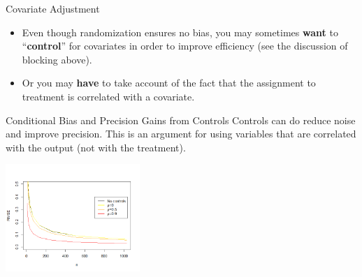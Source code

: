 \documentclass[
  11pt,
  ignorenonframetext,
]{beamer}
\providecommand{\tightlist}{%
  \setlength{\itemsep}{0pt}\setlength{\parskip}{0pt}}\usepackage{longtable,booktabs,array}
\begin{document}
\begin{frame}{Covariate Adjustment\label{CA}}
\protect\hypertarget{covariate-adjustment-4}{}
\begin{itemize}
\tightlist
\item
  Even though randomization ensures no bias, you may sometimes
  \textbf{want} to ``\textbf{control}'' for covariates in order to
  improve efficiency (see the discussion of blocking above).
\item
  Or you may \textbf{have} to take account of the fact that the
  assignment to treatment is correlated with a covariate.
\end{itemize}
\end{frame}

\begin{frame}{Conditional Bias and Precision Gains from Controls}
\protect\hypertarget{conditional-bias-and-precision-gains-from-controls}{}
Controls can do reduce noise and improve precision. This is an argument
for using variables that are correlated with the output (not with the
treatment).

\includegraphics[width=2in,height=\textheight]{figs/n.png}
\end{frame}

\end{document}
